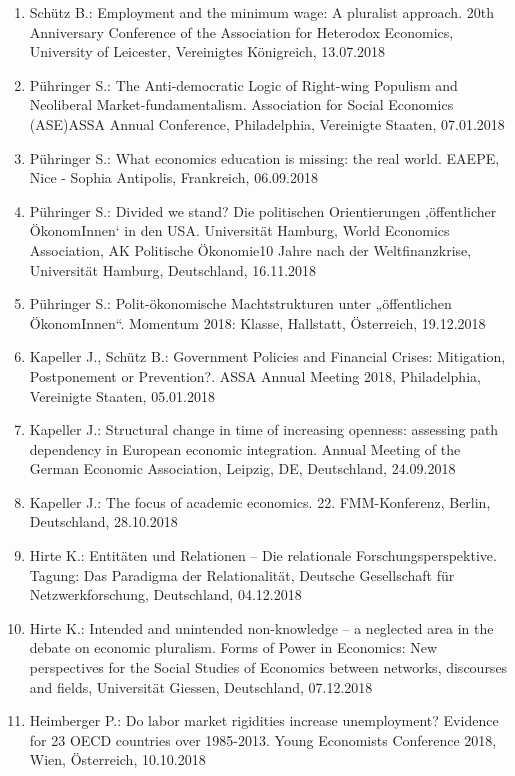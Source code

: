 \begin{enumerate}
	\item Schütz B.: Employment and the minimum wage: A pluralist approach. 20th Anniversary Conference of the Association for Heterodox Economics, University of Leicester, Vereinigtes Königreich, 13.07.2018
	\item Pühringer S.: The Anti-democratic Logic of Right-wing Populism and Neoliberal Market-fundamentalism. Association for Social Economics (ASE)ASSA Annual Conference, Philadelphia, Vereinigte Staaten, 07.01.2018
	\item Pühringer S.: What economics education is missing: the real world. EAEPE, Nice - Sophia Antipolis, Frankreich, 06.09.2018
	\item Pühringer S.: Divided we stand? Die politischen Orientierungen ‚öffentlicher ÖkonomInnen‘ in den USA. Universität Hamburg, World Economics Association, AK Politische Ökonomie10 Jahre nach der Weltfinanzkrise, Universität Hamburg, Deutschland, 16.11.2018
	\item Pühringer S.: Polit-ökonomische Machtstrukturen unter „öffentlichen ÖkonomInnen“. Momentum 2018: Klasse, Hallstatt, Österreich, 19.12.2018
	\item Kapeller J., Schütz B.: Government Policies and Financial Crises: Mitigation, Postponement or Prevention?. ASSA Annual Meeting 2018, Philadelphia, Vereinigte Staaten, 05.01.2018
	\item Kapeller J.: Structural change in time of increasing openness: assessing path dependency in European economic integration. Annual Meeting of the German Economic Association, Leipzig, DE, Deutschland, 24.09.2018
	\item Kapeller J.: The focus of academic economics. 22. FMM-Konferenz, Berlin, Deutschland, 28.10.2018
	\item Hirte K.: Entitäten und Relationen – Die relationale Forschungsperspektive. Tagung: Das Paradigma der Relationalität, Deutsche Gesellschaft für Netzwerkforschung, Deutschland, 04.12.2018
	\item Hirte K.: Intended and unintended non-knowledge – a neglected area in the debate on economic pluralism. Forms of Power in Economics: New perspectives for the Social Studies of Economics between networks, discourses and fields, Universität Giessen, Deutschland, 07.12.2018
	\item Heimberger P.: Do labor market rigidities increase unemployment? Evidence for 23 OECD countries over 1985-2013. Young Economists Conference 2018, Wien, Österreich, 10.10.2018

\end{enumerate}
